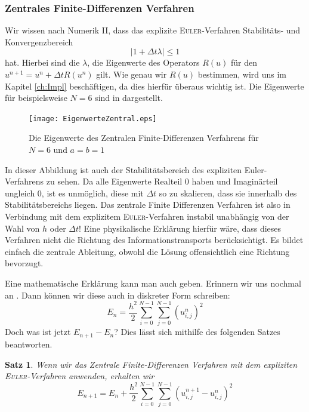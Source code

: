 \documentclass[12pt,a4paper]{scrartcl}
\numberwithin{equation}{section} %
\theoremstyle{definition}
\theoremstyle{plain}
\newtheorem{sa}[auf]{Satz}
\newcommand{\abs}[1]{\left\vert #1\right\vert}
\begin{document}
\subsubsection{Zentrales Finite-Differenzen Verfahren}
Wir wissen nach Numerik II, dass das explizite \textsc{Euler}-Verfahren Stabilitäts- und Konvergenzbereich
\begin{equation}
\abs{1+\Delta t\lambda}\le 1
\end{equation}
hat. Hierbei sind die $\lambda$, die Eigenwerte des Operators $R(u)$ für den $u^{n+1}=u^n+\Delta tR(u^n)$ gilt.
Wie genau wir $R(u)$ bestimmen, wird uns im Kapitel \ref{ch:Impl} beschäftigen, da dies hierfür überaus wichtig ist. Die Eigenwerte für beispielsweise $N=6$ sind in  dargestellt.
\begin{figure}[t]
\centering
\texttt{[image: EigenwerteZentral.eps]}
\caption{Die Eigenwerte des Zentralen Finite-Differenzen Verfahrens für $N=6$ und $a=b=1$}
\label{fig:Eig}
\end{figure}
In dieser Abbildung ist auch der Stabilitätsbereich des expliziten Euler-Verfahrens zu sehen. Da alle Eigenwerte Realteil $0$ haben und Imaginärteil ungleich $0$, ist es unmöglich, diese mit $\Delta t$ so zu skalieren, dass sie innerhalb des Stabilitätsbereichs liegen. Das zentrale Finite Differenzen Verfahren ist also in Verbindung mit dem explizitem \textsc{Euler}-Verfahren instabil unabhängig von der Wahl von $h$ oder $\Delta t$! Eine physikalische Erklärung hierfür wäre, dass dieses Verfahren nicht die Richtung des Informationstransports berücksichtigt. Es bildet einfach die zentrale Ableitung, obwohl die Lösung offensichtlich eine Richtung bevorzugt.
\par Eine mathematische Erklärung kann man auch geben. Erinnern wir uns nochmal an . Dann können wir diese auch in diskreter Form schreiben:
\begin{equation}
E_n=\frac{h^2}{2}\sum_{i=0}^{N-1}\sum_{j=0}^{N-1}(u_{i,j}^n)^2
\end{equation}
Doch was ist jetzt $E_{n+1}-E_n$? Dies lässt sich mithilfe des folgenden Satzes beantworten.
\newpage
\begin{sa}
Wenn wir das Zentrale Finite-Differenzen Verfahren mit dem expliziten \textsc{Euler}-Verfahren anwenden, erhalten wir
\begin{equation}
E_{n+1}=E_n+\frac{h^2}{2}\sum_{i=0}^{N-1}\sum_{j=0}^{N-1}(u^{n+1}_{i,j}-u^n_{i,j})^2
\label{eq:En2Dzent}
\end{equation}
\end{sa}
\end{document}
